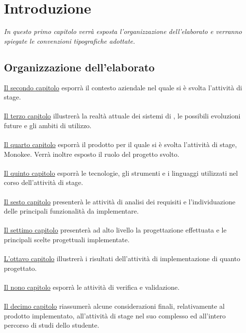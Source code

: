 \chapter{Introduzione}
\textit{In questo primo capitolo verrà esposta l'organizzazione dell'elaborato e verranno spiegate le convenzioni tipografiche adottate.}

\section{Organizzazione dell'elaborato}
\hyperref[azienda]{Il secondo capitolo} esporrà il contesto aziendale nel quale si è svolta l'attività di stage. \\ \\
\hyperref[identita]{Il terzo capitolo} illustrerà la realtà attuale dei sistemi di , le possibili evoluzioni future e gli ambiti di utilizzo. \\ \\
\hyperref[progetto]{Il quarto capitolo} esporrà il prodotto per il quale si è svolta l'attività di stage, Monokee. Verrà inoltre esposto il ruolo del progetto svolto. \\ \\
\hyperref[tecnologie]{Il quinto capitolo} esporrà le tecnologie, gli strumenti e i linguaggi utilizzati nel corso dell'attività di stage. \\ \\
\hyperref[adr]{Il sesto capitolo} presenterà le attività di analisi dei requisiti e l'individuazione delle principali funzionalità da implementare. \\ \\
\hyperref[progettazione]{Il settimo capitolo} presenterà ad alto livello la progettazione effettuata e le principali scelte progettuali implementate. \\ \\
\hyperref[implementazione]{L'ottavo capitolo} illustrerà i risultati dell'attività di implementazione di quanto progettato. \\ \\
\hyperref[vev]{Il nono capitolo} esporrà le attività di verifica e validazione. \\ \\
\hyperref[conclusioni]{Il decimo capitolo} riassumerà alcune considerazioni finali, relativamente al prodotto implementato, all'attività di stage nel suo complesso ed all'intero percorso di studi dello studente.

